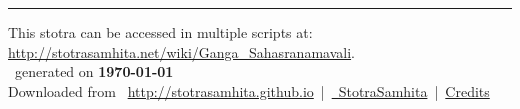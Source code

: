 \documentclass[a5paper,twoside,12pt]{book}
\begin{document}
\setmainfont[Script=Devanagari,Mapping=tex-text]{Sanskrit 2003}
\fontsize {16}{19.25}\selectfont
\let\head\chapt
\begin{center}

\end{center}
\vfill
\centering
\rule{0.8\textwidth}{0.6pt}

\footnotesize
{}\sffamily
This stotra can be accessed in multiple scripts at:\\
\url{http://stotrasamhita.net/wiki/Ganga_Sahasranamavali}.\\[1ex]
\faFilePdfO~generated on \textbf{\today}\\[1ex]
Downloaded from \faGlobe{}~\url{http://stotrasamhita.github.io}~|~\href{https://github.com/StotraSamhita}{\faGithubSquare{}~StotraSamhita}~|~\href{https://stotrasamhita.github.io/about/}{Credits}
\end{document}
